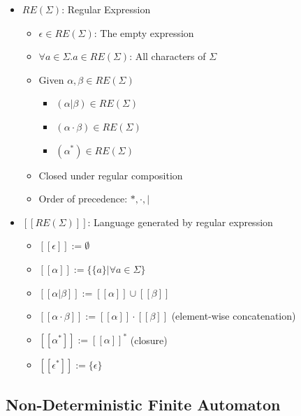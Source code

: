 \documentclass{scrartcl}
\begin{document}
\begin{itemize}
	\item $ RE(\Sigma) $: Regular Expression
	\begin{itemize}
		\item $ \epsilon \in RE(\Sigma) $: The empty expression
		\item $ \forall a \in \Sigma.a \in RE(\Sigma) $: All characters of $ \Sigma $
		\item Given $ \alpha,\beta \in RE(\Sigma) $
		\begin{itemize}
			\item $ (\alpha \vert \beta) \in RE(\Sigma) $
			\item $ (\alpha \cdot \beta) \in RE(\Sigma) $
			\item $ (\alpha^*) \in RE(\Sigma) $
		\end{itemize}
		\item Closed under regular composition
		\item Order of precedence: $ *,\cdot,\vert $
	\end{itemize}
	\item $ [[RE(\Sigma)]] $: Language generated by regular expression
	\begin{itemize}
		\item $ [[\epsilon]] := \emptyset $
		\item $ [[\alpha]] := \{\{a\}\vert \forall a \in \Sigma\} $
		\item $ [[\alpha\vert\beta]] := [[\alpha]] \cup [[\beta]] $
		\item $ [[\alpha\cdot\beta]] := [[\alpha]]\cdot[[\beta]] $ (element-wise concatenation)
		\item $ [[\alpha^*]] := [[\alpha]]^* $ (closure)
		\item $ [[\epsilon^*]] := \{\epsilon\} $
	\end{itemize}
\end{itemize}

\subsection{Non-Deterministic Finite Automaton}


	
\end{document}
